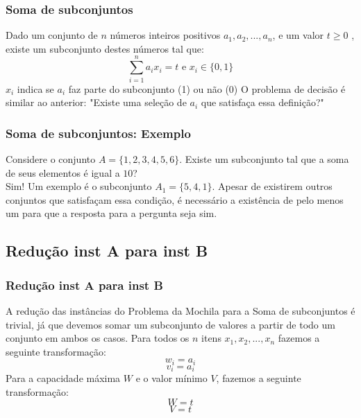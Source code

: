 \documentclass{beamer}
\begin{document}
\begin{frame}
    \frametitle{Soma de subconjuntos}
        Dado um conjunto de $n$ números inteiros positivos $a_{1}, a_{2}, ..., a_{n}$, e um valor $t \geq 0$ , existe um subconjunto destes números tal que:
         \begin{equation*}
            \sum_{i=1}^{n} a_{i} x_{i} = t \mbox{ e } x_{i} \in \{0,1\}
         \end{equation*}
        $x_{i}$ indica se $a_{i}$ faz parte do subconjunto (1) ou não (0)
        \newline
        \newline
        O problema de decisão é similar ao anterior: "Existe uma seleção de $a_{i}$ que satisfaça essa definição?"
\end{frame}

\begin{frame}
    \frametitle{Soma de subconjuntos: Exemplo}
        Considere o conjunto $A = \{1, 2, 3, 4, 5, 6\}$. Existe um subconjunto tal que a soma de seus elementos é igual a $10$? \\
        Sim! Um exemplo é o subconjunto $A_{1} = \{5, 4, 1\}$. Apesar de existirem outros conjuntos que satisfaçam essa condição, é necessário a existência de pelo menos um para que a resposta para a pergunta seja sim.
\end{frame}

\subsection{Redução inst A para inst B}
\begin{frame}
    \frametitle{Redução inst A para inst B}
        A redução das instâncias do Problema da Mochila para a Soma de subconjuntos é trivial, já que devemos somar um subconjunto de valores a partir de todo um conjunto em ambos os casos.
        \newline
        \newline
        Para todos os $n$ itens $x_{1}, x_{2}, ..., x_{n}$ fazemos a seguinte transformação:
        \begin{equation*}
            w_{i} = a_{i}
        \end{equation*}
        \begin{equation*}
            v_{i} = a_{i}
        \end{equation*}
        Para a capacidade máxima $W$ e o valor mínimo $V$, fazemos a seguinte transformação:
        \begin{equation*}
            W = t
        \end{equation*}
        \begin{equation*}
            V = t
        \end{equation*}
        
\end{frame}
\end{document}

